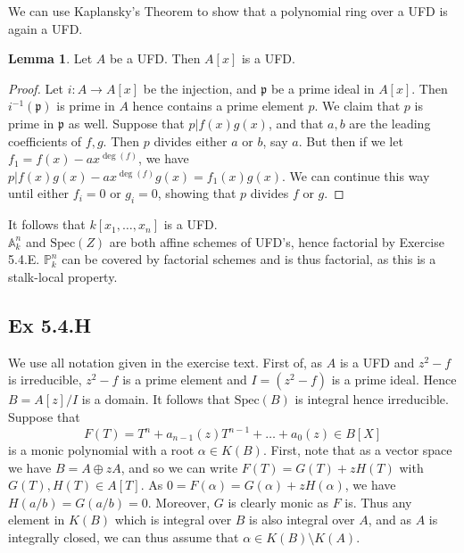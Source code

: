 \documentclass{article}
\theoremstyle{definition}
\newtheorem{lemma}[theorem]{Lemma}
\renewcommand{\P}{\mathbb{P}}
\newcommand{\A}{\mathbb{A}}
\newcommand{\Spec}{\text{Spec}}
\begin{document}
We can use Kaplansky's Theorem to show that a polynomial ring over a UFD
is again a UFD.

\begin{lemma}
	Let $A$ be a UFD. Then $A[x]$ is a UFD.	
\end{lemma}
\begin{proof}
	Let $i : A \to A[x]$ be the injection, and $\mathfrak{p}$ be a prime ideal
	in $A[x]$. Then $i^{-1}(\mathfrak{p})$ is prime in $A$ hence contains a
	prime element $p$. We claim that $p$ is prime in $\mathfrak{p}$ as well.
	Suppose that $p | f(x)g(x)$, and that $a, b$ are the leading coefficients
	of $f, g$. Then $p$ divides either $a$ or $b$, say $a$. But then if we let
	$f_1 = f(x) - ax^{\deg(f)}$, we have $p | f(x)g(x) - ax^{\deg(f)}g(x) =
	f_1(x)g(x)$. We can continue this way until either $f_i = 0$ or $g_i = 0$,
	showing that $p$ divides $f$ or $g$.
\end{proof}

It follows that $k[x_1, \ldots, x_n]$ is a UFD. \\

$\A^{n}_{k}$ and $\Spec(Z)$ are both affine schemes of UFD's, hence factorial
by Exercise 5.4.E. $\P^{n}_k$ can be covered by factorial schemes and is thus
factorial, as this is a stalk-local property. 

\subsection*{Ex 5.4.H}

We use all notation given in the exercise text. First of, as $A$ is a UFD and
$z^2 - f$ is irreducible, $z^2 - f$ is a prime element and $I = (z^2 - f)$ is a
prime ideal. Hence $B = A[z]/I$ is a domain. It follows that $\Spec(B)$ is
integral hence irreducible. \\

Suppose that
\[
	F(T)
	=
	T^{n}
	+
	a_{n - 1}(z) T^{n - 1}
	+
	\ldots
	+
	a_0(z)
	\in B[X]
\]
is a monic polynomial with a root $\alpha \in K(B)$. First, note that as a
vector space we have $B = A \oplus z A$, and so we can write $F(T) = G(T) + z
H(T)$ with $G(T), H(T) \in A[T]$. As $0 = F(\alpha) = G(\alpha) + z H(\alpha)$,
we have $H(a/b) = G(a/b) = 0$. Moreover, $G$ is clearly monic as $F$ is. Thus
any element in $K(B)$ which is integral over $B$ is also integral over $A$, and
as $A$ is integrally closed, we can thus assume that $\alpha \in K(B) \setminus
K(A)$. \\
\end{document}
